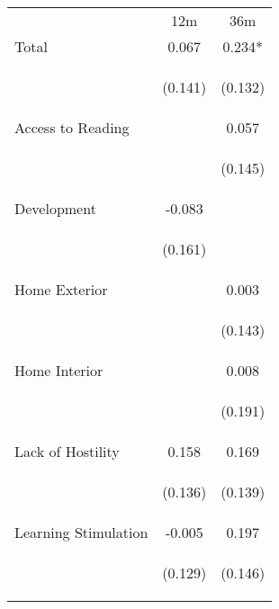 \begin{tabular}{lcc}
\hline \noalign{\smallskip} & 12m & 36m\\
\noalign{\smallskip}\hline \noalign{\smallskip}Total & 0.067 & 0.234*\\
 & \begin{footnotesize}(0.141)\end{footnotesize} & \begin{footnotesize}(0.132)\end{footnotesize}\\
\noalign{\smallskip}Access to Reading &  & 0.057\\
 & \begin{footnotesize}\end{footnotesize} & \begin{footnotesize}(0.145)\end{footnotesize}\\
\noalign{\smallskip}Development & -0.083 & \\
 & \begin{footnotesize}(0.161)\end{footnotesize} & \begin{footnotesize}\end{footnotesize}\\
\noalign{\smallskip}Home Exterior &  & 0.003\\
 & \begin{footnotesize}\end{footnotesize} & \begin{footnotesize}(0.143)\end{footnotesize}\\
\noalign{\smallskip}Home Interior &  & 0.008\\
 & \begin{footnotesize}\end{footnotesize} & \begin{footnotesize}(0.191)\end{footnotesize}\\
\noalign{\smallskip}Lack of Hostility & 0.158 & 0.169\\
 & \begin{footnotesize}(0.136)\end{footnotesize} & \begin{footnotesize}(0.139)\end{footnotesize}\\
\noalign{\smallskip}Learning Stimulation & -0.005 & 0.197\\
 & \begin{footnotesize}(0.129)\end{footnotesize} & \begin{footnotesize}(0.146)\end{footnotesize}\\

\end{tabular}
